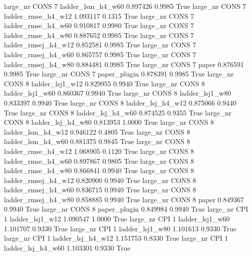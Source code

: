   large_nr     CONS                 7   ladder_lsm_h4_w60   0.897426      0.9985    True
  large_nr     CONS                 7  ladder_rmse_h4_w12   1.093117      0.1315    True
  large_nr     CONS                 7  ladder_rmse_h4_w60   0.910817      0.9980    True
  large_nr     CONS                 7  ladder_rmse_h4_w80   0.887652      0.9985    True
  large_nr     CONS                 7 ladder_rmsej_h4_w12   0.852581      0.9985    True
  large_nr     CONS                 7 ladder_rmsej_h4_w60   0.865757      0.9985    True
  large_nr     CONS                 7 ladder_rmsej_h4_w80   0.884481      0.9985    True
  large_nr     CONS                 7               paper   0.876591      0.9985    True
  large_nr     CONS                 7        paper_plugin   0.878391      0.9985    True
  large_nr     CONS                 8     ladder_lsj1_w12   0.829955      0.9940    True
  large_nr     CONS                 8     ladder_lsj1_w60   0.860367      0.9940    True
  large_nr     CONS                 8     ladder_lsj1_w80   0.833397      0.9940    True
  large_nr     CONS                 8   ladder_lsj_h4_w12   0.875066      0.9440    True
  large_nr     CONS                 8   ladder_lsj_h4_w60   0.874525      0.9355    True
  large_nr     CONS                 8   ladder_lsj_h4_w80   0.813953      1.0000    True
  large_nr     CONS                 8   ladder_lsm_h4_w12   0.946122      0.4805    True
  large_nr     CONS                 8   ladder_lsm_h4_w60   0.881375      0.9845    True
  large_nr     CONS                 8  ladder_rmse_h4_w12   1.068905      0.1120    True
  large_nr     CONS                 8  ladder_rmse_h4_w60   0.897867      0.9805    True
  large_nr     CONS                 8  ladder_rmse_h4_w80   0.866841      0.9940    True
  large_nr     CONS                 8 ladder_rmsej_h4_w12   0.820900      0.9940    True
  large_nr     CONS                 8 ladder_rmsej_h4_w60   0.836715      0.9940    True
  large_nr     CONS                 8 ladder_rmsej_h4_w80   0.858885      0.9940    True
  large_nr     CONS                 8               paper   0.849367      0.9940    True
  large_nr     CONS                 8        paper_plugin   0.849984      0.9940    True
  large_nr      CPI                 1     ladder_lsj1_w12   1.090547      1.0000    True
  large_nr      CPI                 1     ladder_lsj1_w60   1.101707      0.9330    True
  large_nr      CPI                 1     ladder_lsj1_w80   1.101613      0.9330    True
  large_nr      CPI                 1   ladder_lsj_h4_w12   1.151753      0.8330    True
  large_nr      CPI                 1   ladder_lsj_h4_w60   1.103301      0.9330    True
